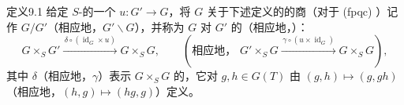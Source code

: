\begin{SGAresult}{定义}{9.1}
给定 $S$-的一个 $u:G'\to G$，将 $G$ 关于下述定义的的商（对于 (fpqc) ）记作 $G/G'$（相应地，$G'\backslash G$），并称为 $G$ 对 $G'$ 的（相应地，）：
\[
G\times_S G'\xrightarrow{\,\delta\circ(\operatorname{id}_G\times u)\,}G\times_S G,
\qquad
\left(\text{相应地， }G'\times_S G\xrightarrow{\,\gamma\circ(u\times\operatorname{id}_G)\,}G\times_S G\right),
\]
其中 $\delta$（相应地，$\gamma$）表示 $G\times_S G$ 的，它对 $g,h\in G(T)$ 由 $(g,h)\mapsto(g,gh)$（相应地，$(h,g)\mapsto(hg,g)$）定义。
\end{SGAresult}

